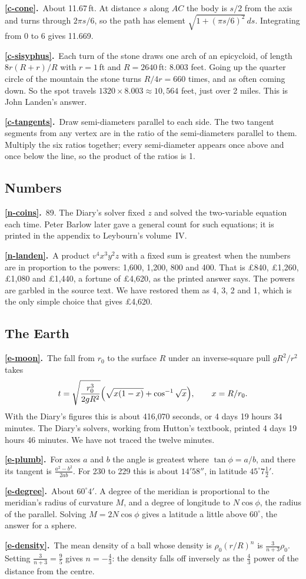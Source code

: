 \documentclass[11pt,a4paper]{article}
\newcommand{\ans}[2]{\par\smallskip\noindent\textbf{\ref{#1}.}\ #2}
\begin{document}
\ans{c-cone}{About 11.67\,ft. At distance $s$ along $AC$ the body is $s/2$ from the axis
and turns through $2\pi s/6$, so the path has element $\sqrt{1 + (\pi s/6)^2}\,ds$.
Integrating from 0 to 6 gives 11.669.}
\ans{c-sisyphus}{Each turn of the stone draws one arch of an epicycloid, of length
$8r(R+r)/R$ with $r = 1$\,ft and $R = 2640$\,ft: 8.003 feet. Going up the quarter circle
of the mountain the stone turns $R/4r = 660$ times, and as often coming down. So the spot
travels $1320 \times 8.003 \approx 10{,}564$ feet, just over 2 miles. This is John Landen's
answer.}
\ans{c-tangents}{Draw semi-diameters parallel to each side. The two tangent segments from
any vertex are in the ratio of the semi-diameters parallel to them. Multiply the six
ratios together; every semi-diameter appears once above and once below the line, so the
product of the ratios is 1.}

\subsection*{Numbers}
\ans{n-coins}{89. The Diary's solver fixed $z$ and solved the two-variable equation
each time. Peter Barlow later gave a general count for such equations; it is printed in
the appendix to Leybourn's volume~IV.}
\ans{n-landen}{A product $v^4x^3y^2z$ with a fixed sum is greatest when the numbers are in
proportion to the powers: 1,600, 1,200, 800 and 400. That is \pounds840, \pounds1,260,
\pounds1,080 and \pounds1,440, a fortune of \pounds4,620, as the printed answer says. The
powers are garbled in the source text. We have restored them as 4, 3, 2 and 1, which is
the only simple choice that gives \pounds4,620.}

\subsection*{The Earth}
\ans{e-moon}{The fall from $r_0$ to the surface $R$ under an inverse-square pull
$gR^2/r^2$ takes
\[t = \sqrt{\frac{r_0^3}{2gR^2}}\Bigl(\sqrt{x(1-x)} + \cos^{-1}\sqrt x\Bigr),
\qquad x = R/r_0.\]
With the Diary's figures this is about 416{,}070 seconds, or 4 days 19 hours 34 minutes.
The Diary's solvers, working from Hutton's textbook, printed 4 days 19 hours 46 minutes.
We have not traced the twelve minutes.}
\ans{e-plumb}{For axes $a$ and $b$ the angle is greatest where $\tan\phi = a/b$, and there
its tangent is $\tfrac{a^2-b^2}{2ab}$. For 230 to 229 this is about $14'58''$, in latitude
$45^\circ7\tfrac12'$.}
\ans{e-degree}{About $60^\circ4'$. A degree of the meridian is proportional to the
meridian's radius of curvature $M$, and a degree of longitude to $N\cos\phi$, the radius
of the parallel. Solving $M = 2N\cos\phi$ gives a latitude a little above $60^\circ$, the
answer for a sphere.}
\ans{e-density}{The mean density of a ball whose density is $\rho_0(r/R)^n$ is
$\tfrac3{n+3}\rho_0$. Setting $\tfrac3{n+3} = \tfrac95$ gives $n = -\tfrac43$: the density
falls off inversely as the $\tfrac43$ power of the distance from the centre.}
\end{document}
